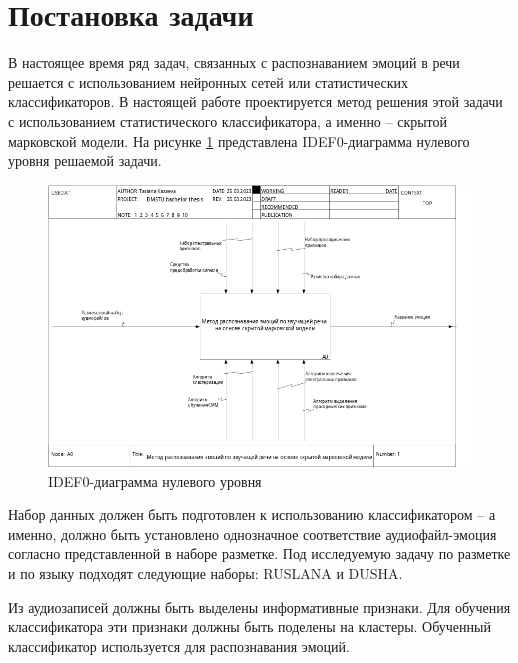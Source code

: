 \section{Постановка задачи}
В настоящее время ряд задач, связанных с распознаванием эмоций в речи решается с использованием нейронных сетей или статистических классификаторов. В настоящей работе проектируется метод решения этой задачи с использованием статистического классификатора, а именно -- скрытой марковской модели. На рисунке \ref{fig:idef0} представлена IDEF0-диаграмма нулевого уровня решаемой задачи.
\begin{figure}[H]
	\centering
	\includegraphics[width=\linewidth]{assets/01_A0.png}
	\caption{IDEF0-диаграмма нулевого уровня}
	\label{fig:idef0}
\end{figure}
Набор данных должен быть подготовлен к использованию классификатором -- а именно, должно быть установлено однозначное соответствие аудиофайл-эмоция согласно представленной в наборе разметке. Под исследуемую задачу по разметке и по языку подходят следующие наборы: RUSLANA и DUSHA. 

Из аудиозаписей должны быть выделены информативные признаки. Для обучения классификатора эти признаки должны быть поделены на кластеры. Обученный классификатор используется для распознавания эмоций.
